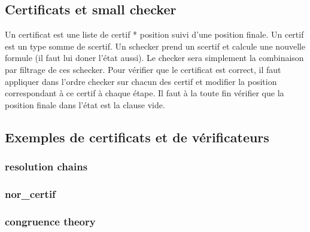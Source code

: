 \subsection{Certificats et small checker}
Un certificat est une liste de certif * position suivi d'une position finale.
Un certif est un type somme de scertif.
Un schecker prend un scertif et calcule une nouvelle formule (il faut lui doner l'état aussi).
Le checker sera simplement la combinaison par filtrage de ces schecker.
Pour vérifier que le certificat est correct, il faut appliquer dans l'ordre checker sur
chacun des certif et modifier la position correspondant à ce certif à chaque étape.
Il faut à la toute fin vérifier que la position finale dans l'état est la clause vide.

\subsection{Exemples de certificats et de vérificateurs}
\subsubsection{resolution chains}




\subsubsection{nor\_certif}
\subsubsection{congruence theory}






